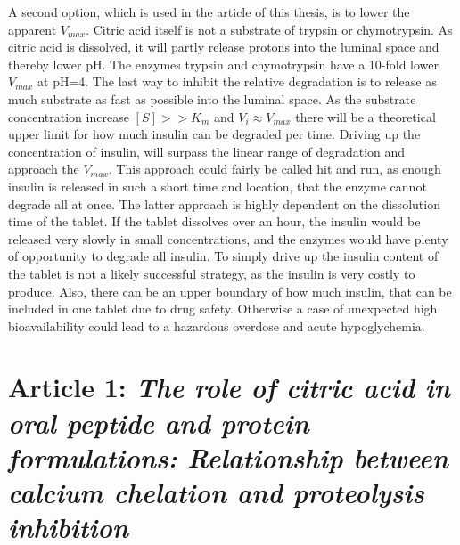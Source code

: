A second option, which is used in the article \cite{welling2014citric} of this thesis, is to lower the apparent $V_{max}$. Citric acid itself is not a substrate of trypsin or chymotrypsin. As citric acid is dissolved, it will partly release protons into the luminal space and thereby lower pH. The enzymes trypsin and chymotrypsin have a 10-fold lower $V_{max}$ at pH=4.
The last way to inhibit the relative degradation is to release as much substrate as fast as possible into the luminal space. As the substrate concentration increase $[S] >> K_m$ and $V_i \approx V_{max}$ there will be a theoretical upper limit for how much insulin can be degraded per time. Driving up the concentration of insulin, will surpass the linear range of degradation and approach the $V_{max}$. This approach could fairly be called hit and run, as enough insulin is released in such a short time and location, that the enzyme cannot degrade all at once. The latter approach is highly dependent on the dissolution time of the tablet. If the tablet dissolves over an hour, the insulin would be released very slowly in small concentrations, and the enzymes would have plenty of opportunity to degrade all insulin. To simply drive up the insulin content of the tablet is not a likely successful strategy, as the insulin is very costly to produce. Also, there can be an upper boundary of how much insulin, that can be included in one tablet due to drug safety. Otherwise a case of unexpected high bioavailability could lead to a hazardous overdose and acute hypoglychemia.

\section{Article 1: \textit{The role of citric acid in oral peptide and protein formulations: Relationship between calcium chelation and proteolysis inhibition}}
\label{article:citric}
\newpage
